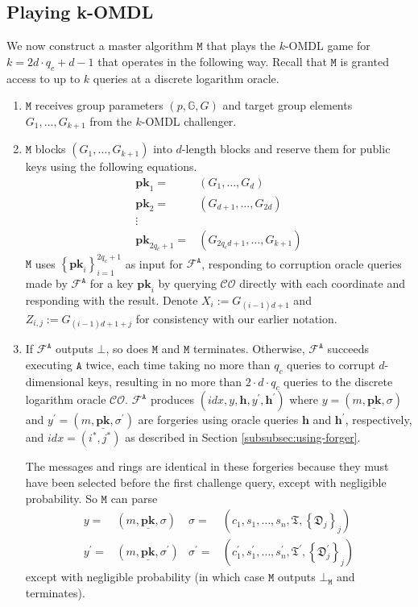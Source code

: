 \documentclass{mrl}
\theoremstyle{plain}
\theoremstyle{definition}
\begin{document}
\subsection{Playing k-OMDL}
We now construct a master algorithm $\texttt{M}$ that plays the $k$-OMDL game for $k=2d\cdot q_c + d-1$ that operates in the following way. Recall that $\texttt{M}$ is granted access to up to $k$ queries at a discrete logarithm oracle.
\begin{enumerate}

\item $\texttt{M}$ receives group parameters $(p, \mathbb{G}, G)$ and target group elements $G_1, \ldots, G_{k+1}$ from the $k$-OMDL challenger.

\item $\texttt{M}$ blocks $(G_1, \ldots, G_{k+1})$ into $d$-length blocks and reserve them for public keys using the following equations.
\begin{align*}
\textbf{pk}_1 =& (G_1, \ldots, G_d) \\
\textbf{pk}_2 =& (G_{d+1}, \ldots, G_{2d}) \\
\vdots & \\
\textbf{pk}_{2q_c + 1} =& (G_{2q_c d+1}, \ldots, G_{k+1}) 
\end{align*}  $\texttt{M}$ uses $\left\{\textbf{pk}_i\right\}_{i=1}^{2q_c + 1}$ as input for $\mathcal{F}^{\texttt{A}}$, responding to corruption oracle queries made by $\mathcal{F}^{\texttt{A}}$ for a key $\textbf{pk}_i$ by querying $\mathcal{CO}$ directly with each coordinate and responding with the result. Denote $X_i := G_{(i-1)d + 1}$ and $Z_{i,j} := G_{(i-1)d + 1 + j}$ for consistency with our earlier notation.

\item If $\mathcal{F}^{\texttt{A}}$ outputs $\bot$, so does $\texttt{M}$ and $\texttt{M}$ terminates. Otherwise, $\mathcal{F}^{\texttt{A}}$ succeeds executing $\texttt{A}$ twice, each time taking no more than $q_c$ queries to corrupt $d$-dimensional keys, resulting in no more than $2\cdot d\cdot q_c$ queries to the discrete logarithm oracle $\mathcal{CO}$. $\mathcal{F}^{\texttt{A}}$ produces $(\textit{idx}, y, \textbf{h}, y^\prime, \textbf{h}^\prime)$ where $y = (m, \underline{\textbf{pk}}, \sigma)$ and $y^\prime = (m, \underline{\textbf{pk}}, \sigma^\prime)$ are forgeries using oracle queries $\textbf{h}$ and $\textbf{h}^\prime$, respectively, and $\textit{idx} = (i^*, j^*)$ as described  in Section \ref{subsubsec:using-forger}.

The messages and rings are identical in these forgeries because they must have been selected before the first challenge query, except with negligible probability. So $\texttt{M}$ can parse 
\begin{align*}
y =& (m, \underline{\textbf{pk}}, \sigma) & \sigma =& (c_1, s_1, \ldots, s_n, \mathfrak{T}, \left\{\mathfrak{D}_j\right\}_j) \\
y^\prime =& (m, \underline{\textbf{pk}}, \sigma^\prime) & \sigma^\prime =& (c_1^\prime, s_1^\prime, \ldots, s_n^\prime, \mathfrak{T}^\prime, \left\{\mathfrak{D}_j^\prime\right\}_j)\end{align*} except with negligible probability (in which case $\texttt{M}$ outputs $\bot_{\texttt{M}}$ and terminates).


\end{enumerate}
\end{document}
